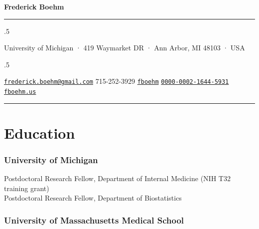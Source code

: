 \documentclass[
  11pt,
]
{article}
\begin{document}
\centerline{\huge \bf Frederick Boehm}

\vspace{2 mm}

\hrule

\vspace{2 mm}


\moveleft.5\hoffset\centerline{University of Michigan · 419 Waymarket DR
· Ann Arbor, MI 48103 · USA}
\moveleft.5\hoffset\centerline{ \faEnvelopeO \hspace{1 mm} \href{mailto:}{\tt frederick.boehm@gmail.com} \hspace{1 mm}  \faPhone \hspace{1 mm}  715-252-3929  \hspace{1 mm}  \faGithub \hspace{1 mm} \href{http://github.com/fboehm}{\tt fboehm} \hspace{1 mm}      \hspace{.5 mm} \href{https://orcid.org/0000-0002-1644-5931}{\tt 0000-0002-1644-5931} \hspace{1 mm}  \faGlobe \hspace{1 mm} \href{http://fboehm.us}{\tt fboehm.us}   }



\vspace{2 mm}

\hrule



\hypertarget{education}{%
\section{Education}\label{education}}

\hypertarget{university-of-michigan}{%
\subsubsection{University of Michigan}\label{university-of-michigan}}

Postdoctoral Research Fellow, Department of Internal Medicine (NIH T32
training grant)\\
Postdoctoral Research Fellow, Department of Biostatistics

\hypertarget{university-of-massachusetts-medical-school}{%
\subsubsection{University of Massachusetts Medical
School}\label{university-of-massachusetts-medical-school}}
\end{document}
